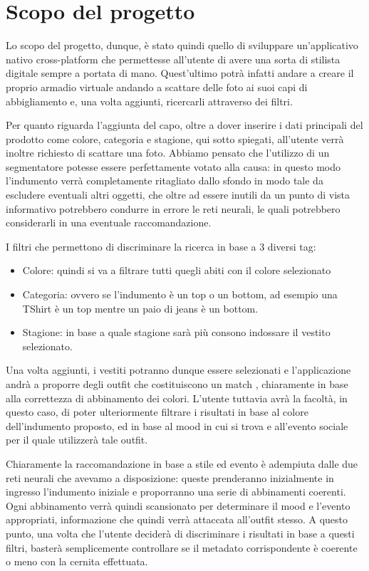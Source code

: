 \chapter{Scopo del progetto}\label{ch:scopo}

Lo scopo del progetto, dunque, è stato quindi quello di sviluppare un'applicativo nativo cross-platform che permettesse all'utente di avere una sorta di stilista digitale sempre a portata di mano. Quest'ultimo potrà infatti andare a creare il proprio armadio virtuale andando a scattare delle foto ai suoi capi di abbigliamento e, una volta aggiunti, ricercarli attraverso dei filtri.

Per quanto riguarda l'aggiunta del capo, oltre a dover inserire i dati principali del prodotto come colore, categoria e stagione, qui sotto spiegati, all'utente verrà inoltre richiesto di scattare una foto. Abbiamo pensato che l'utilizzo di un segmentatore potesse essere perfettamente votato alla causa: in questo modo l'indumento verrà completamente ritagliato dallo sfondo in modo tale da escludere eventuali altri oggetti, che oltre ad essere inutili da un punto di vista informativo potrebbero condurre in errore le reti neurali, le quali potrebbero considerarli in una eventuale raccomandazione.

I filtri che permettono di discriminare la ricerca in base a 3 diversi tag:
\begin{itemize}
\item Colore: quindi si va a filtrare tutti quegli abiti con il colore selezionato
\item Categoria: ovvero se l'indumento è un top o un bottom, ad esempio una TShirt è un top mentre un paio di jeans è un bottom.
\item Stagione: in base a quale stagione sarà più consono indossare il vestito selezionato.
\end{itemize}

Una volta aggiunti, i vestiti potranno dunque essere selezionati e l'applicazione andrà a proporre degli outfit che costituiscono un match , chiaramente in base alla correttezza di abbinamento dei colori. L'utente tuttavia avrà la facoltà, in questo caso, di poter ulteriormente filtrare i risultati in base al colore dell'indumento proposto, ed in base al mood in cui si trova e all'evento sociale per il quale utilizzerà tale outfit.

Chiaramente la raccomandazione in base a stile ed evento è adempiuta dalle due reti neurali che avevamo a disposizione: queste prenderanno inizialmente in ingresso l'indumento iniziale e proporranno una serie di abbinamenti coerenti. Ogni abbinamento verrà quindi scansionato per determinare il mood e l'evento appropriati, informazione che quindi verrà attaccata all'outfit stesso. A questo punto, una volta che l'utente deciderà di discriminare i risultati in base a questi filtri, basterà semplicemente controllare se il metadato corrispondente è coerente o meno con la cernita effettuata.

